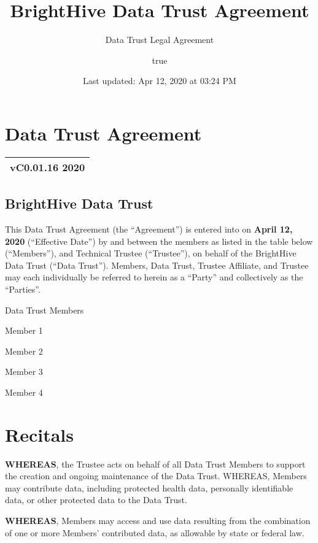 \documentclass[]{book}
\title{BrightHive Data Trust Agreement}
\subtitle{Data Trust Legal Agreement}
\author{true}
\date{Last updated: Apr 12, 2020 at 03:24 PM}
\begin{document}
\maketitle

{
\setcounter{tocdepth}{1}
\tableofcontents
}
\hypertarget{data-trust-agreement}{%
\chapter*{Data Trust Agreement}\label{data-trust-agreement}}

\begin{longtable}[]{@{}l@{}}
\toprule
\endhead
\textbf{vC0.01.16 2020}\tabularnewline
\bottomrule
\end{longtable}

\hypertarget{brighthive-data-trust}{%
\section*{BrightHive Data Trust}\label{brighthive-data-trust}}

This Data Trust Agreement (the ``Agreement'') is entered into on \textbf{April 12, 2020} (``Effective Date'') by and between the members as listed in the table below (``Members''), and Technical Trustee (``Trustee''), on behalf of the BrightHive Data Trust (``Data Trust''). Members, Data Trust, Trustee Affiliate, and Trustee may each individually be referred to herein as a ``Party'' and collectively as the ``Parties''.

Data Trust Members

Member 1

Member 2

Member 3

Member 4

\hypertarget{recitals}{%
\chapter{Recitals}\label{recitals}}

\textbf{WHEREAS}, the Trustee acts on behalf of all Data Trust Members to support the creation and ongoing maintenance of the Data Trust. WHEREAS, Members may contribute data, including protected health data, personally identifiable data, or other protected data to the Data Trust.

\textbf{WHEREAS}, Members may access and use data resulting from the combination of one or more Members' contributed data, as allowable by state or federal law.
\end{document}
